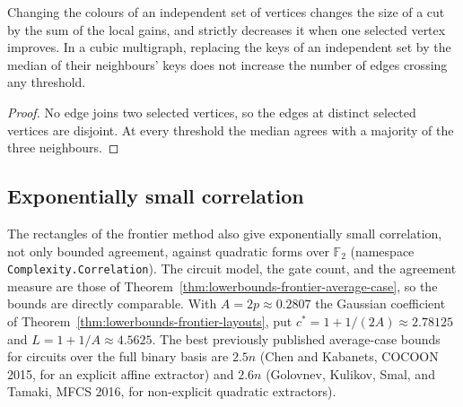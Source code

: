 \begin{theorem}
  \label{thm:lowerbounds-frontier-local}
  \leanok
  Changing the colours of an independent set of vertices changes the size of a
  cut by the sum of the local gains, and strictly decreases it when one selected
  vertex improves. In a cubic multigraph, replacing the keys of an independent set
  by the median of their neighbours' keys does not increase the number of edges
  crossing any threshold.
\end{theorem}
\begin{proof}
  \leanok
  No edge joins two selected vertices, so the edges at distinct selected vertices
  are disjoint. At every threshold the median agrees with a majority of the three
  neighbours.
\end{proof}

\subsection{Exponentially small correlation}
\label{sec:lowerbounds-frontier-correlation}

The rectangles of the frontier method also give exponentially small
correlation, not only bounded agreement, against quadratic forms over
$\mathbb{F}_2$ (namespace \texttt{Complexity.Correlation}). The circuit model,
the gate count, and the agreement measure are those of
Theorem~\ref{thm:lowerbounds-frontier-average-case}, so the bounds are directly
comparable. With $A=2p\approx0.2807$ the Gaussian coefficient of
Theorem~\ref{thm:lowerbounds-frontier-layouts}, put $c^*=1+1/(2A)\approx2.78125$
and $L=1+1/A\approx4.5625$. The best previously published average-case bounds
for circuits over the full binary basis are $2.5n$ (Chen and Kabanets, COCOON
2015, for an explicit affine extractor) and $2.6n$ (Golovnev, Kulikov, Smal, and
Tamaki, MFCS 2016, for non-explicit quadratic extractors).

